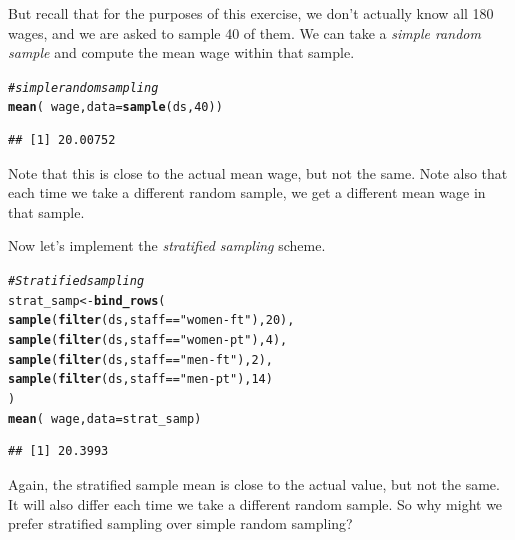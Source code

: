 \documentclass[10pt]{article}\usepackage[]{graphicx}\usepackage[]{color}
\makeatletter
\newcommand{\hlnum}[1]{\textcolor[rgb]{0.686,0.059,0.569}{#1}}%
\newcommand{\hlstr}[1]{\textcolor[rgb]{0.192,0.494,0.8}{#1}}%
\newcommand{\hlcom}[1]{\textcolor[rgb]{0.678,0.584,0.686}{\textit{#1}}}%
\newcommand{\hlopt}[1]{\textcolor[rgb]{0,0,0}{#1}}%
\newcommand{\hlstd}[1]{\textcolor[rgb]{0.345,0.345,0.345}{#1}}%
\newcommand{\hlkwb}[1]{\textcolor[rgb]{0.69,0.353,0.396}{#1}}%
\newcommand{\hlkwc}[1]{\textcolor[rgb]{0.333,0.667,0.333}{#1}}%
\newcommand{\hlkwd}[1]{\textcolor[rgb]{0.737,0.353,0.396}{\textbf{#1}}}%
\newenvironment{kframe}{%
 \def\at@end@of@kframe{}%
 \ifinner\ifhmode%
  \def\at@end@of@kframe{\end{minipage}}%
  \begin{minipage}{\columnwidth}%
 \fi\fi%
 \def\FrameCommand##1{\hskip\@totalleftmargin \hskip-\fboxsep
 \colorbox{shadecolor}{##1}\hskip-\fboxsep
     \hskip-\linewidth \hskip-\@totalleftmargin \hskip\columnwidth}%
 \MakeFramed {\advance\hsize-\width
   \@totalleftmargin\z@ \linewidth\hsize
   \@setminipage}}%
 {\par\unskip\endMakeFramed%
 \at@end@of@kframe}
\newenvironment{knitrout}{}{} %
\makeatother
\begin{document}
But recall that for the purposes of this exercise, we don't actually know all 180 wages, and we are asked to sample 40 of them. We can take a \emph{simple random sample} and compute the mean wage within that sample.

\begin{knitrout}
\color{fgcolor}\begin{kframe}
\begin{alltt}
\hlcom{# simple random sampling}
\hlkwd{mean}\hlstd{(}\hlopt{~}\hlstd{wage,} \hlkwc{data} \hlstd{=} \hlkwd{sample}\hlstd{(ds,} \hlnum{40}\hlstd{))}
\end{alltt}
\begin{verbatim}
## [1] 20.00752
\end{verbatim}
\end{kframe}
\end{knitrout}

Note that this is close to the actual mean wage, but not the same. Note also that each time we take a different random sample, we get a different mean wage in that sample. 

Now let's implement the \emph{stratified sampling} scheme.

\begin{knitrout}
\color{fgcolor}\begin{kframe}
\begin{alltt}
\hlcom{# Stratified sampling}
\hlstd{strat_samp} \hlkwb{<-} \hlkwd{bind_rows}\hlstd{(}
  \hlkwd{sample}\hlstd{(}\hlkwd{filter}\hlstd{(ds, staff} \hlopt{==} \hlstr{"women-ft"}\hlstd{),} \hlnum{20}\hlstd{),}
  \hlkwd{sample}\hlstd{(}\hlkwd{filter}\hlstd{(ds, staff} \hlopt{==} \hlstr{"women-pt"}\hlstd{),} \hlnum{4}\hlstd{),}
  \hlkwd{sample}\hlstd{(}\hlkwd{filter}\hlstd{(ds, staff} \hlopt{==} \hlstr{"men-ft"}\hlstd{),} \hlnum{2}\hlstd{),}
  \hlkwd{sample}\hlstd{(}\hlkwd{filter}\hlstd{(ds, staff} \hlopt{==} \hlstr{"men-pt"}\hlstd{),} \hlnum{14}\hlstd{)}
\hlstd{)}
\hlkwd{mean}\hlstd{(}\hlopt{~}\hlstd{wage,} \hlkwc{data} \hlstd{= strat_samp)}
\end{alltt}
\begin{verbatim}
## [1] 20.3993
\end{verbatim}
\end{kframe}
\end{knitrout}

Again, the stratified sample mean is close to the actual value, but not the same. It will also differ each time we take a different random sample. So why might we prefer stratified sampling over simple random sampling?
  
\end{document}
